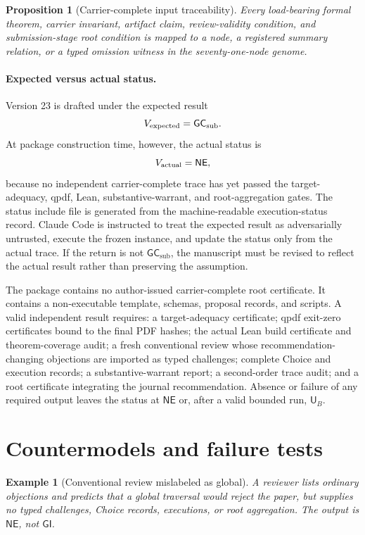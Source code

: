 \documentclass[10pt]{article}
\newtheorem{proposition}[definition]{Proposition}
\newtheorem{example}[definition]{Example}
\newcommand{\GI}{\mathsf{GI}}
\newcommand{\UB}{\mathsf{U}_B}
\newcommand{\NE}{\mathsf{NE}}
\newcommand{\GCsub}{\mathsf{GC}_{\mathrm{sub}}}
\begin{document}
\begin{proposition}[Carrier-complete input traceability]\label{prop:instance}
Every load-bearing formal theorem, carrier invariant, artifact claim, review-validity condition, and submission-stage root condition is mapped to a node, a registered summary relation, or a typed omission witness in the seventy-one-node genome.
\end{proposition}

\paragraph{Expected versus actual status.}
Version 23 is drafted under the expected result
\[
  V_{\mathrm{expected}}=\ExpectedOverallGCA.
\]
At package construction time, however, the actual status is
\[
  V_{\mathrm{actual}}=\ActualOverallGCA,
\]
because no independent carrier-complete trace has yet passed the target-adequacy, qpdf, Lean, substantive-warrant, and root-aggregation gates.  The status include file is generated from the machine-readable execution-status record.  Claude Code is instructed to treat the expected result as adversarially untrusted, execute the frozen instance, and update the status only from the actual trace.  If the return is not $\GCsub$, the manuscript must be revised to reflect the actual result rather than preserving the assumption.

The package contains no author-issued carrier-complete root certificate.  It contains a non-executable template, schemas, proposal records, and scripts.  A valid independent result requires: a target-adequacy certificate; qpdf exit-zero certificates bound to the final PDF hashes; the actual Lean build certificate and theorem-coverage audit; a fresh conventional review whose recommendation-changing objections are imported as typed challenges; complete Choice and execution records; a substantive-warrant report; a second-order trace audit; and a root certificate integrating the journal recommendation.  Absence or failure of any required output leaves the status at $\NE$ or, after a valid bounded run, $\UB$.


\section{Countermodels and failure tests}

\begin{example}[Conventional review mislabeled as global]
A reviewer lists ordinary objections and predicts that a global traversal would reject the paper, but supplies no typed challenges, Choice records, executions, or root aggregation.  The output is $\NE$, not $\GI$.
\end{example}
\end{document}
